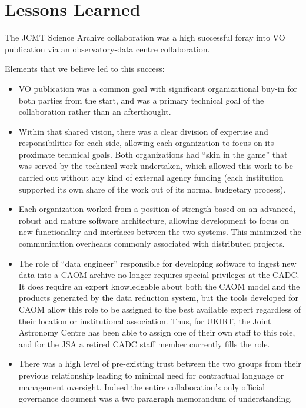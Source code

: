 \documentclass[final,authoryear,5p,times,twocolumn]{elsarticle}
\begin{document}
\section{Lessons Learned}

The JCMT Science Archive collaboration was a high successful foray
into VO publication via an observatory-data centre collaboration.

Elements that we believe led to this success:

\begin{itemize}
\item VO publication was a common goal with significant organizational
  buy-in for both parties from the start, and was a primary technical
  goal of the collaboration rather than an afterthought.

\item Within that shared vision, there was a clear division of
  expertise and responsibilities for each side, allowing each
  organization to focus on its proximate technical goals. Both
  organizations had ``skin in the game'' that was served by the
  technical work undertaken, which allowed this work to be carried out
  without any kind of external agency funding (each institution
  supported its own share of the work out of its normal budgetary
  process).

\item Each organization worked from a position of strength based on an
  advanced, robust and mature software architecture, allowing
  development to focus on new functionality and interfaces between the
  two systems. This minimized the communication overheads commonly
  associated with distributed projects.

\item The role of ``data engineer'' responsible for developing software to
ingest new data into a CAOM archive no longer requires special privileges
at the CADC.  It does require an expert
knowledgable about both the CAOM model and the products generated
by the data reduction system, but the tools developed for CAOM
allow this role to be assigned to the best available expert regardless of their
location or institutional association.  Thus, for UKIRT, the Joint Astronomy Centre has been able to
assign one of their own staff to this role, and for the JSA a retired CADC staff
member currently fills the role.

\item There was a high level of pre-existing trust between the two
  groups from their previous relationship leading to minimal need for
  contractual language or management oversight. Indeed the entire
  collaboration's only official governance document was a two paragraph
  memorandum of understanding.
\end{itemize}
\end{document}
